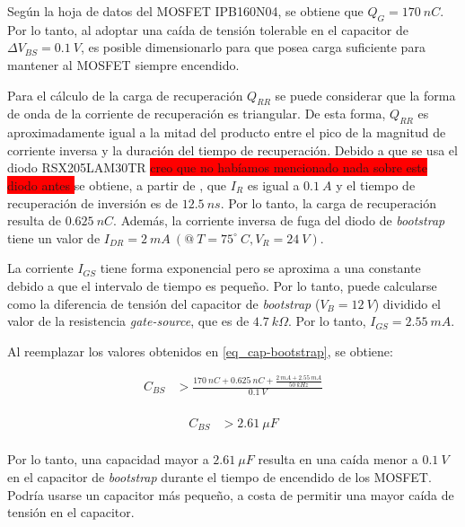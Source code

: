 \noindent Según la hoja de datos \cite{IPB160N04} del MOSFET IPB160N04, se obtiene que $Q_G= 170\:nC$. Por lo tanto, al adoptar una caída de tensión tolerable en el capacitor de $\Delta V_{BS} = 0.1\:V$, es posible dimensionarlo para que posea carga suficiente para mantener al MOSFET siempre encendido.

\noindent Para el cálculo de la carga de recuperación $Q_{RR}$ se puede considerar que la forma de onda de la corriente de recuperación es triangular. De esta forma,  $Q_{RR}$ es aproximadamente igual a la mitad del producto entre el pico de la magnitud de corriente inversa y la duración del tiempo de recuperación.  Debido a que se usa el diodo RSX205LAM30TR \colorbox{red}{creo que no habíamos mencionado nada sobre este diodo antes } se obtiene, a partir de \cite{RSX205LAM30}, que  $I_R$ es igual a $0.1\:A$  y  el tiempo de recuperación de inversión es de $12.5\:ns$. Por lo tanto, la carga de recuperación resulta de $0.625\:nC$. Además, la corriente inversa de fuga del diodo de \textsl{bootstrap} tiene un valor de $I_{DR} =2 \:mA\:(@\: T=75^{\circ}\:C, V_R= 24\:V)$.

\noindent La corriente $I_{GS}$ tiene forma exponencial pero se aproxima a una constante debido a que el intervalo de tiempo es pequeño. Por lo tanto, puede calcularse como la diferencia de tensión del capacitor de \textsl{bootstrap} ($V_B=12\:V$) dividido el valor de la resistencia \textsl{gate-source}, que es de $4.7\:k\Omega$. Por lo tanto, $I_{GS}=2.55 \:mA$. 


\noindent Al reemplazar los valores obtenidos en \ref{eq_cap-bootstrap}, se obtiene:

\begin{equation} 
	\begin{aligned}
		C_{BS} &> \frac{170 \:nC + 0.625\:nC + \frac{2 \:mA + 2.55 \:mA}{50 \:kHz}}{0.1 \:V}\\
	\end{aligned}
\end{equation}

\begin{equation} 
	\begin{aligned}
		C_{BS} &> 2.61 \:\mu F\\	
	\end{aligned}
\end{equation}


\noindent Por lo tanto, una capacidad mayor a $2.61 \:\mu F$ resulta en una caída menor a $0.1\:V$ en el capacitor de \textsl{bootstrap} durante el tiempo de encendido de los MOSFET. Podría usarse un capacitor más pequeño, a costa de permitir una mayor caída de tensión en el capacitor. 

